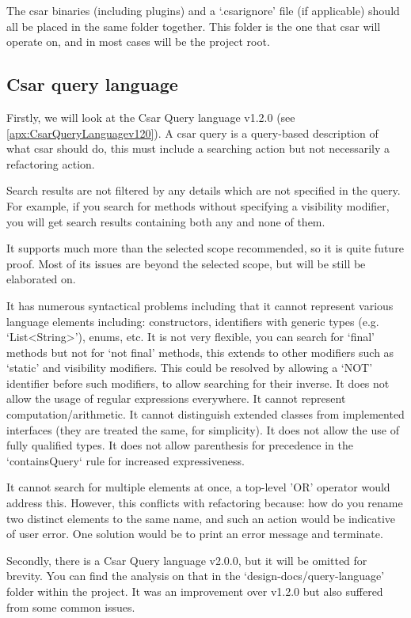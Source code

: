 \documentclass[12pt, letterpaper]{article}
\begin{document}
The csar binaries (including plugins) and a `.csarignore' file (if applicable) should all be placed in the same folder together.
This folder is the one that csar will operate on, and in most cases will be the project root.

\subsection{Csar query language}
\label{sec:DesignCsarQuery}
Firstly, we will look at the Csar Query language v1.2.0 (see \ref{apx:CsarQueryLanguagev120}).
A csar query is a query-based description of what csar should do, this must include a searching action but not necessarily a refactoring action.

Search results are not filtered by any details which are not specified in the query.
For example, if you search for methods without specifying a visibility modifier, you will get search results containing both any and none of them.

It supports much more than the selected scope recommended, so it is quite future proof.
Most of its issues are beyond the selected scope, but will be still be elaborated on.

It has numerous syntactical problems including that it cannot represent various language elements including: constructors, identifiers with generic types (e.g. `List<String>'), enums, etc.
It is not very flexible, you can search for `final' methods but not for `not final' methods, this extends to other modifiers such as `static' and visibility modifiers.
This could be resolved by allowing a `NOT' identifier before such modifiers, to allow searching for their inverse.
It does not allow the usage of regular expressions everywhere.
It cannot represent computation/arithmetic.
It cannot distinguish extended classes from implemented interfaces (they are treated the same, for simplicity).
It does not allow the use of fully qualified types.
It does not allow parenthesis for precedence in the `containsQuery` rule for increased expressiveness.

It cannot search for multiple elements at once, a top-level 'OR' operator would address this.  
However, this conflicts with refactoring because: how do you rename two distinct elements to the same name, and such an action would be indicative of user error.
One solution would be to print an error message and terminate.

Secondly, there is a Csar Query language v2.0.0, but it will be omitted for brevity.
You can find the analysis on that in the `design-docs/query-language' folder within the project.
It was an improvement over v1.2.0 but also suffered from some common issues.
\end{document}
